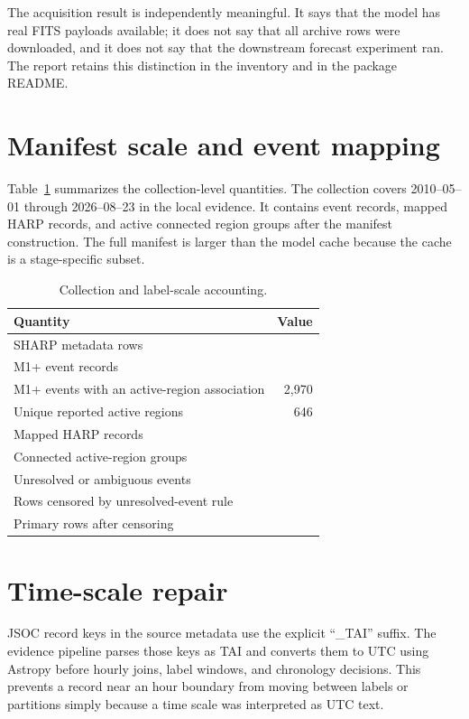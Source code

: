 \documentclass[11pt,oneside]{report}
\begin{document}
The acquisition result is independently meaningful. It says that the model has real FITS payloads available; it does not say that all archive rows were downloaded, and it does not say that the downstream forecast experiment ran. The report retains this distinction in the inventory and in the package README.

\section{Manifest scale and event mapping}

Table~\ref{tab:scale} summarizes the collection-level quantities. The collection covers 2010--05--01 through 2026--08--23 in the local evidence. It contains \MOneEvents{} event records, \MappedHarps{} mapped HARP records, and \GroupCount{} active connected region groups after the manifest construction. The full manifest is larger than the model cache because the cache is a stage-specific subset.

\begin{table}[H]
\centering
\caption{Collection and label-scale accounting.}
\label{tab:scale}
\begin{tabular}{lr}
\toprule
Quantity & Value \\
\midrule
SHARP metadata rows & \ManifestCount{} \\
M1+ event records & \MOneEvents{} \\
M1+ events with an active-region association & 2,970 \\
Unique reported active regions & 646 \\
Mapped HARP records & \MappedHarps{} \\
Connected active-region groups & \GroupCount{} \\
Unresolved or ambiguous events & \UnresolvedEvents{} \\
Rows censored by unresolved-event rule & \CensoredRows{} \\
Primary rows after censoring & \PrimaryCount{} \\
\bottomrule
\end{tabular}
\end{table}

\section{Time-scale repair}

JSOC record keys in the source metadata use the explicit ``\_TAI'' suffix. The evidence pipeline parses those keys as TAI and converts them to UTC using Astropy before hourly joins, label windows, and chronology decisions. This prevents a record near an hour boundary from moving between labels or partitions simply because a time scale was interpreted as UTC text.
\end{document}
